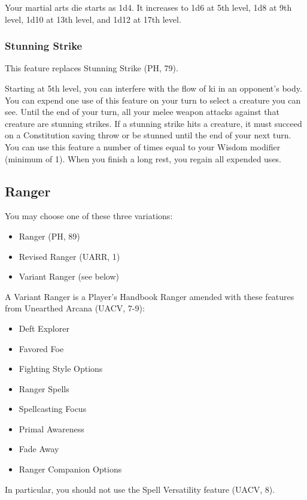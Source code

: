 \documentclass[letterpaper,twocolumn,openany,nodeprecatedcode]{dndbook}
\begin{document}
Your martial arts die starts as 1d4. It increases to 1d6 at 5th level, 1d8 at 9th level, 1d10 at 13th level, and 1d12 at 17th level.

\subsubsection{Stunning Strike}
This feature replaces Stunning Strike (PH, 79).

Starting at 5th level, you can interfere with the flow of ki in an opponent's body. You can expend one use of this feature on your turn to select a creature you can see. Until the end of your turn, all your melee weapon attacks against that creature are stunning strikes. If a stunning strike hits a creature, it must succeed on a Constitution saving throw or be stunned until the end of your next turn. You can use this feature a number of times equal to your Wisdom modifier (minimum of 1). When you finish a long rest, you regain all expended uses.

\subsection{Ranger}
\label{classRanger}

You may choose one of these three variations:

\begin{itemize}
    \item Ranger (PH, 89)
    \item Revised Ranger (UARR, 1)
    \item Variant Ranger (see below)
\end{itemize}

A Variant Ranger is a Player's Handbook Ranger amended with these features from Unearthed Arcana (UACV, 7-9):

\begin{itemize}
    \item Deft Explorer
    \item Favored Foe
    \item Fighting Style Options
    \item Ranger Spells
    \item Spellcasting Focus
    \item Primal Awareness
    \item Fade Away
    \item Ranger Companion Options
\end{itemize}

In particular, you should not use the Spell Versatility feature (UACV, 8).
\end{document}
